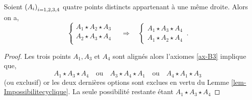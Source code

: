 \begin{cor}\label{cor-configurationordrequatrepoint-1}
Soient $\left(A_{i}\right)_{i = 1,2,3,4}$ quatre points distincts appartenant à une même droite. Alors on a,
        \begin{equation*}
        \left\{
            \begin{array}{c}
                 A_{1} \star A_{2} \star A_{3} \\
                 A_{2} \star A_{3} \star A_{4}\\
            \end{array}
            \right. \quad \Longrightarrow \quad \left\{
            \begin{array}{c}
                A_1 \star A_3 \star A_4\\
                A_1 \star A_2 \star A_4
            \end{array}
            \right.\,.
    \end{equation*}
    \begin{proof}
        Les trois points $A_1,A_3$ et $A_4$ sont alignés alors l'axiomes \ref{ax-B3} implique que,
        \begin{equation*}
            A_1 \star A_3 \star A_4 \quad\text{ou}\quad A_3 \star A_4 \star A_1 \quad\text{ou}\quad A_4 \star A_1 \star A_3 
        \end{equation*}
        (ou exclusif) or les deux dernières options sont exclues en vertu du Lemme \ref{lem-Impossibilitecyclique}. La seule possibilité restante étant $A_1 \star A_3 \star A_4$


\end{proof}
\end{cor}
